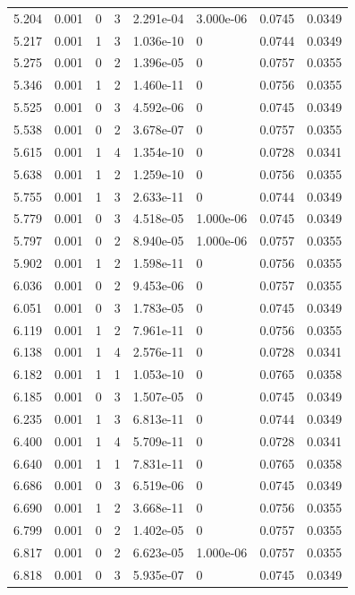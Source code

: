 \documentclass[preview]{standalone}
\begin{document}
{{{\begin{tabular}{L{1.2cm}C{1.2cm} C{0.3cm}C{0.5cm} C{1.4cm}C{1.4cm} C{1.4cm}C{1.4cm}}
  5.204  &  0.001  & 0     &  3 &  2.291e-04  & 3.000e-06  & 0.0745 &  0.0349   \\ 
  5.217  &  0.001  & 1     &  3 &  1.036e-10  & 0  & 0.0744 &  0.0349   \\ 
  5.275  &  0.001  & 0     &  2 &  1.396e-05  & 0  & 0.0757 &  0.0355   \\ 
  5.346  &  0.001  & 1     &  2 &  1.460e-11  & 0  & 0.0756 &  0.0355   \\ 
  5.525  &  0.001  & 0     &  3 &  4.592e-06  & 0  & 0.0745 &  0.0349   \\ 
  5.538  &  0.001  & 0     &  2 &  3.678e-07  & 0  & 0.0757 &  0.0355   \\ 
  5.615  &  0.001  & 1     &  4 &  1.354e-10  & 0  & 0.0728 &  0.0341   \\ 
  5.638  &  0.001  & 1     &  2 &  1.259e-10  & 0  & 0.0756 &  0.0355   \\ 
  5.755  &  0.001  & 1     &  3 &  2.633e-11  & 0  & 0.0744 &  0.0349   \\ 
  5.779  &  0.001  & 0     &  3 &  4.518e-05  & 1.000e-06  & 0.0745 &  0.0349   \\ 
  5.797  &  0.001  & 0     &  2 &  8.940e-05  & 1.000e-06  & 0.0757 &  0.0355   \\ 
  5.902  &  0.001  & 1     &  2 &  1.598e-11  & 0  & 0.0756 &  0.0355   \\ 
  6.036  &  0.001  & 0     &  2 &  9.453e-06  & 0  & 0.0757 &  0.0355   \\ 
  6.051  &  0.001  & 0     &  3 &  1.783e-05  & 0  & 0.0745 &  0.0349   \\ 
  6.119  &  0.001  & 1     &  2 &  7.961e-11  & 0  & 0.0756 &  0.0355   \\ 
  6.138  &  0.001  & 1     &  4 &  2.576e-11  & 0  & 0.0728 &  0.0341   \\ 
  6.182  &  0.001  & 1     &  1 &  1.053e-10  & 0  & 0.0765 &  0.0358   \\ 
  6.185  &  0.001  & 0     &  3 &  1.507e-05  & 0  & 0.0745 &  0.0349   \\ 
  6.235  &  0.001  & 1     &  3 &  6.813e-11  & 0  & 0.0744 &  0.0349   \\ 
  6.400  &  0.001  & 1     &  4 &  5.709e-11  & 0  & 0.0728 &  0.0341   \\ 
  6.640  &  0.001  & 1     &  1 &  7.831e-11  & 0  & 0.0765 &  0.0358   \\ 
  6.686  &  0.001  & 0     &  3 &  6.519e-06  & 0  & 0.0745 &  0.0349   \\ 
  6.690  &  0.001  & 1     &  2 &  3.668e-11  & 0  & 0.0756 &  0.0355   \\ 
  6.799  &  0.001  & 0     &  2 &  1.402e-05  & 0  & 0.0757 &  0.0355   \\ 
  6.817  &  0.001  & 0     &  2 &  6.623e-05  & 1.000e-06  & 0.0757 &  0.0355   \\ 
  6.818  &  0.001  & 0     &  3 &  5.935e-07  & 0  & 0.0745 &  0.0349   \\ 
\hline 
\end{tabular} 

}}}
\end{document}
